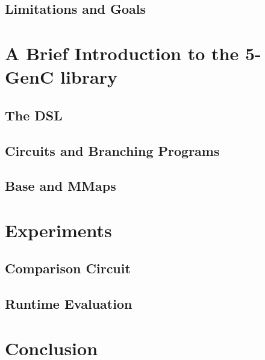 \documentclass[12pt,twoside]{reedthesis}
\begin{document}
    \section{Limitations and Goals}
    
    
    
    \chapter{ A Brief Introduction to the 5-GenC library}
    \section{ The DSL}
    \section{Circuits and Branching Programs}
    \section{Base and MMaps}
    
    \chapter{Experiments}
    \section{Comparison Circuit}
    \section{Runtime Evaluation}
    
    
    \chapter{Conclusion} 
    
    
    
    

 

\end{document}
